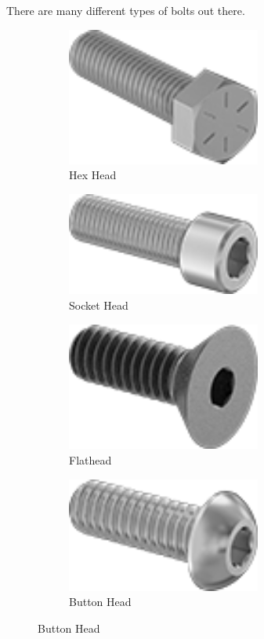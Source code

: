 \documentclass[10pt,letterpaper]{book}
\begin{document}
	There are many different types of bolts out there.
	
	\begin{figure}[H]
		\centering
		\begin{subfigure}[b]{.24\linewidth}
			\includegraphics[width=0.7\textwidth]{imgs/hhcs.png}
			\caption{Hex Head}
		\end{subfigure}\begin{subfigure}[b]{.24\linewidth}
			\includegraphics[width=0.7\textwidth]{imgs/shcs.png}
			\caption{Socket Head}
		\end{subfigure}\begin{subfigure}[b]{.24\linewidth}
			\includegraphics[width=0.7\textwidth]{imgs/fhcs.png}
			\caption{Flathead}
		\end{subfigure}\begin{subfigure}[b]{.24\linewidth}
			\includegraphics[width=0.7\textwidth]{imgs/bhcs.png}
			\caption{Button Head}
		\end{subfigure}
		

\end{figure}
\end{document}

